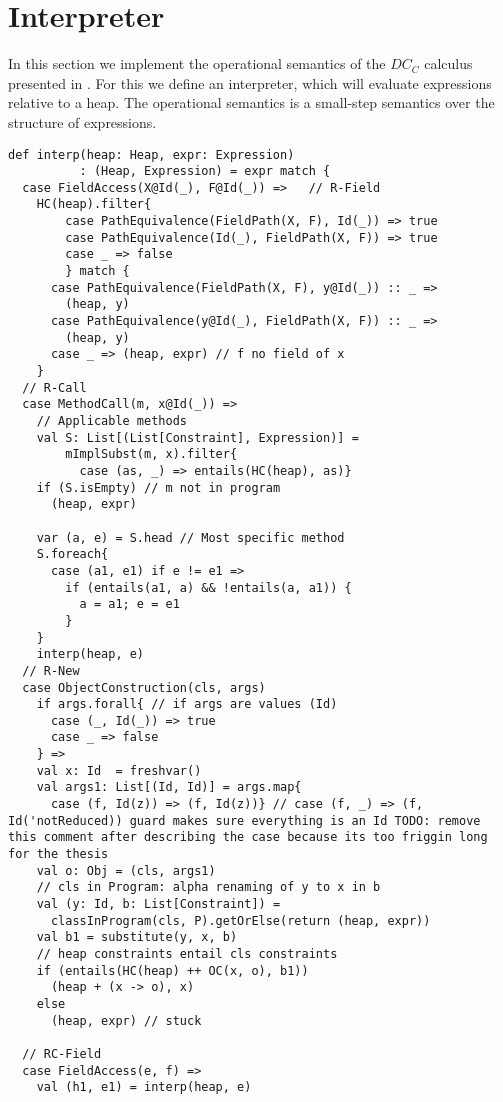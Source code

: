 \section{Interpreter}
In this section we implement
the operational semantics of the $DC_C$ calculus
presented in .
For this we define an interpreter,
which will evaluate expressions relative to a heap.
The operational semantics is a small-step semantics over
the structure of expressions.
%
\begin{lstlisting}[caption={Interpreter},label=lst:interp,captionpos=b,frame={lines}]
def interp(heap: Heap, expr: Expression)
          : (Heap, Expression) = expr match {
  case FieldAccess(X@Id(_), F@Id(_)) =>   // R-Field
    HC(heap).filter{
        case PathEquivalence(FieldPath(X, F), Id(_)) => true
        case PathEquivalence(Id(_), FieldPath(X, F)) => true
        case _ => false
        } match {
      case PathEquivalence(FieldPath(X, F), y@Id(_)) :: _ =>
        (heap, y)
      case PathEquivalence(y@Id(_), FieldPath(X, F)) :: _ =>
        (heap, y)
      case _ => (heap, expr) // f no field of x
    }
  // R-Call
  case MethodCall(m, x@Id(_)) =>
    // Applicable methods
    val S: List[(List[Constraint], Expression)] =
        mImplSubst(m, x).filter{
          case (as, _) => entails(HC(heap), as)}
    if (S.isEmpty) // m not in program
      (heap, expr)

    var (a, e) = S.head // Most specific method
    S.foreach{
      case (a1, e1) if e != e1 =>
        if (entails(a1, a) && !entails(a, a1)) {
          a = a1; e = e1
        }
    }
    interp(heap, e)
  // R-New
  case ObjectConstruction(cls, args)
    if args.forall{ // if args are values (Id)
      case (_, Id(_)) => true
      case _ => false
    } =>
    val x: Id  = freshvar()
    val args1: List[(Id, Id)] = args.map{
      case (f, Id(z)) => (f, Id(z))} // case (f, _) => (f, Id('notReduced)) guard makes sure everything is an Id TODO: remove this comment after describing the case because its too friggin long for the thesis
    val o: Obj = (cls, args1)
    // cls in Program: alpha renaming of y to x in b
    val (y: Id, b: List[Constraint]) =
      classInProgram(cls, P).getOrElse(return (heap, expr))
    val b1 = substitute(y, x, b)
    // heap constraints entail cls constraints
    if (entails(HC(heap) ++ OC(x, o), b1))
      (heap + (x -> o), x)
    else
      (heap, expr) // stuck
      
  // RC-Field
  case FieldAccess(e, f) =>
    val (h1, e1) = interp(heap, e)


\end{lstlisting}
